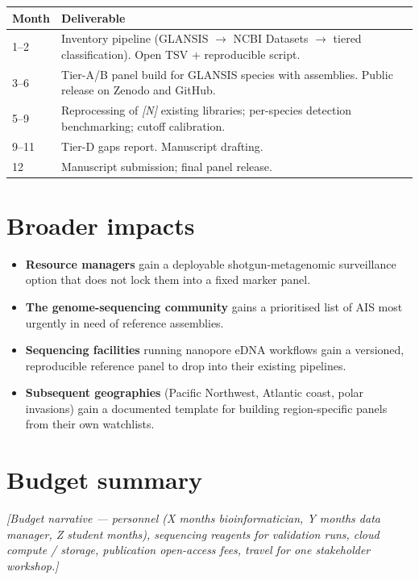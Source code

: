 \documentclass[11pt, letterpaper]{article}
\newcommand{\placeholder}[1]{\textcolor{mutedgray}{\textit{[#1]}}}
\begin{document}
\begin{center}
\begin{tabularx}{\textwidth}{l X}
\toprule
\textbf{Month} & \textbf{Deliverable} \\
\midrule
1--2  & Inventory pipeline (GLANSIS $\rightarrow$ NCBI Datasets $\rightarrow$ tiered classification). Open TSV + reproducible script. \\
3--6  & Tier-A/B panel build for GLANSIS species with assemblies. Public release on Zenodo and GitHub. \\
5--9  & Reprocessing of \placeholder{N} existing libraries; per-species detection benchmarking; cutoff calibration. \\
9--11 & Tier-D gaps report. Manuscript drafting. \\
12    & Manuscript submission; final panel release. \\
\bottomrule
\end{tabularx}
\end{center}

\section{Broader impacts}

\begin{itemize}[leftmargin=1.5em]
  \item \textbf{Resource managers} gain a deployable shotgun-metagenomic surveillance option that does not lock them into a fixed marker panel.
  \item \textbf{The genome-sequencing community} gains a prioritised list of AIS most urgently in need of reference assemblies.
  \item \textbf{Sequencing facilities} running nanopore eDNA workflows gain a versioned, reproducible reference panel to drop into their existing pipelines.
  \item \textbf{Subsequent geographies} (Pacific Northwest, Atlantic coast, polar invasions) gain a documented template for building region-specific panels from their own watchlists.
\end{itemize}

\section{Budget summary}

\placeholder{Budget narrative --- personnel (X months bioinformatician, Y months data manager, Z student months), sequencing reagents for validation runs, cloud compute / storage, publication open-access fees, travel for one stakeholder workshop.}
\end{document}
